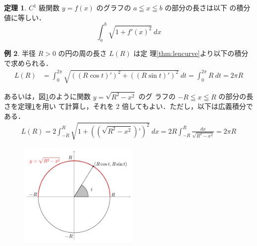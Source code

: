 \documentclass[10pt, uplatex, dvipdfmx]{jsarticle}
\theoremstyle{definition}
\newtheorem{theorem}{定理}[section]
\newtheorem{example}[theorem]{例}
\numberwithin{equation}{section}
\begin{document}
\begin{theorem}\label{thm:lengraph}
  $C^1$ 級関数 $y=f(x)$ のグラフの $a\leqq x \leqq b$ の部分の長さは以下
  の積分値に等しい．
  \[
    \int_{a}^{b} \sqrt{ 1+ {f'(x)}^2} \ dx
  \]
\end{theorem}

\newpage

\begin{example}
  半径 $R>0$ の円の周の長さ $L(R)$ は定
  理\ref{thm:lencurve}より以下の積分で求められる．
  \begin{align*}
    L(R) &= \int_{0}^{2\pi} \sqrt{ \left( \left( R\cos t\right)'\right)^2 
           + \left( \left(R \sin t\right)'\right)^2} \ dt
           = \int_{0}^{2\pi}R  \ dt = 2\pi R
  \end{align*}
  
  あるいは，図\ref{fig:circle_par}のように関数 $y=\sqrt{R^2-x^2}$ のグ
  ラフの $-R \leqq x \leqq R$ の部分の長さを定理\ref{thm:lengraph}を用い
  て計算し，それを $2$ 倍してもよい．ただし，以下は広義積分である．
  \begin{align*}
    L(R) = 2 \int_{-R}^{R} \sqrt{ 1 + \left( \left(\sqrt{R^2-x^2}\right)'\right)^2}\ dx
    = 2 R\int_{-R}^{R} \frac{dx}{\sqrt{R^2-x^2}} = 2\pi R
  \end{align*}
  \begin{figure}[h]
    \centering
    \includegraphics[height=5cm]{./pictures/05/circle_par.pdf}
    \caption{}
    \label{fig:circle_par}
  \end{figure}
  
  
\end{example}
\end{document}
